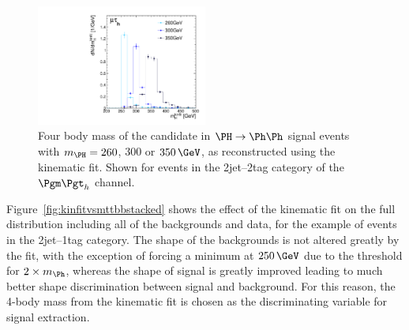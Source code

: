 \begin{figure}
\begin{center}
    \includegraphics[width=0.5\textwidth]
      {plots/Hhh/m_H_kinfit_signalmasses_2jet2tagSFMassCuts_mt.pdf}

\end{center}
\caption[]{
Four body mass of the candidate \PH in $\PH\to\Ph\Ph$ signal events with
$m_{\PH}=260$, $300$ or $350\,\GeV$, as reconstructed using the kinematic fit. 
Shown for events in the 2jet--2tag category of the $\mutau$ channel.}
\label{fig:kinfitsignalmasses}
\end{figure} 

Figure~\ref{fig:kinfitvsmttbbstacked} shows the effect of the kinematic
fit on the full distribution including all of the backgrounds and data, for the
example of events in the 2jet--1tag category. The shape of the backgrounds is
not altered greatly by the fit, with the exception of forcing a minimum at
$250\,\GeV$ due to the threshold for $2\times m_{\Ph}$, whereas the shape of
signal is greatly improved leading to much better shape discrimination between
signal and background. For this reason, the 4-body mass from the kinematic fit
is chosen as the discriminating variable for signal extraction.

